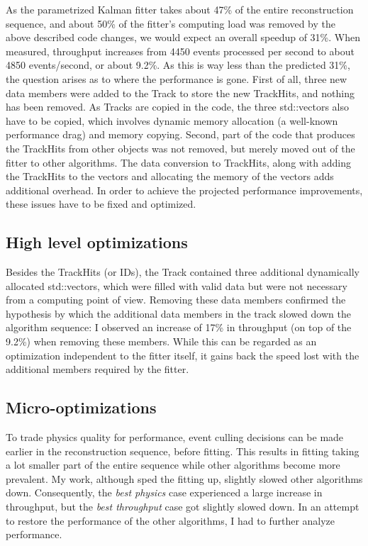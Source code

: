 \documentclass[12pt]{article}
\begin{document}
As the parametrized Kalman fitter takes about 47\% of the entire reconstruction sequence, and about 50\% of the fitter's computing load was removed by the above described code changes, we would expect an overall speedup of 31\%. When measured, throughput increases from 4450 events processed per second to about 4850 events/second, or about 9.2\%. As this is way less than the predicted 31\%, the question arises as to where the performance is gone. First of all, three new data members were added to the Track to store the new TrackHits, and nothing has been removed. As Tracks are copied in the code, the three std::vectors also have to be copied, which involves dynamic memory allocation (a well-known performance drag) and memory copying. Second, part of the code that produces the TrackHits from other objects was not removed, but merely moved out of the fitter to other algorithms. The data conversion to TrackHits, along with adding the TrackHits to the vectors and allocating the memory of the vectors adds additional overhead. In order to achieve the projected performance improvements, these issues have to be fixed and optimized.


\subsection{High level optimizations}

Besides the TrackHits (or IDs), the Track contained three additional dynamically allocated std::vectors, which were filled with valid data but were not necessary from a computing point of view. Removing these data members confirmed the hypothesis by which the additional data members in the track slowed down the algorithm sequence: I observed an increase of 17\% in throughput (on top of the 9.2\%) when removing these members. While this can be regarded as an optimization independent to the fitter itself, it gains back the speed lost with the additional members required by the fitter.

\subsection{Micro-optimizations}

To trade physics quality for performance, event culling decisions can be made earlier in the reconstruction sequence, before fitting. This results in fitting taking a lot smaller part of the entire sequence while other algorithms become more prevalent. My work, although sped the fitting up, slightly slowed other algorithms down. Consequently, the \textit{best physics} case experienced a large increase in throughput, but the \textit{best throughput} case got slightly slowed down. In an attempt to restore the performance of the other algorithms, I had to further analyze performance.
\end{document}
